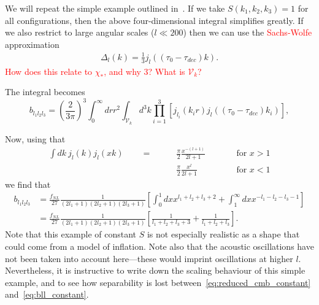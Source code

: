     We will repeat the simple example outlined in~\cite{FergShell_2}. If we
    take $S(k_1,k_2,k_3)=1$ for all configurations, then the above four-dimensional integral
    simplifies greatly. If we also restrict to large angular scales ($l\ll200$)
    then we can use the \textcolor{red}{Sachs-Wolfe} approximation
    \begin{align}
        \Delta_l(k) = \frac{1}{3}j_l((\tau_0-\tau_{dec})k).
    \end{align}
    \textcolor{red}{How does this relate to $\chi_*$, and why $3$? What is $\mathcal{V}_k$?}

    The integral becomes
    \begin{equation}
    \label{eq:reduced_cmb_constant}
    b_{l_1l_2l_3} = \left(\frac{2}{3\pi}\right)^3\int_{0}^{\infty}drr^2
        \int_{\mathcal{V}_k}d^3k \prod_{i=1}^{3}\left[j_{l_i}(k_ir)j_l((\tau_0-\tau_{dec})k_i)\right],
    \end{equation}


    Now, using that
    \begin{align}
        \int dk~j_l(k)j_l(xk)\qquad=\qquad&\frac{\pi}{2}\frac{x^{-(l+1)}}{2l+1}\qquad&&\text{for $x>1$}\\
                            \qquad&\frac{\pi}{2}\frac{x^{l}}{2l+1}\qquad&&\text{for $x<1$}
    \end{align}
    we find that
    \begin{align}
    \label{eq:bll_constant}
        b_{l_1l_2l_3} &= \frac{f_{NL}}{27}\frac{1}{(2l_1+1)(2l_2+1)(2l_3+1)}
        \left[\int^1_0dx x^{l_1+l_2+l_3+2}+\int^\infty_1dx x^{-l_1-l_2-l_3-1}\right]\\
                &= \frac{f_{NL}}{27}\frac{1}{(2l_1+1)(2l_2+1)(2l_3+1)}
        \left[\frac{1}{l_1+l_2+l_3+3}+\frac{1}{l_1+l_2+l_3}\right].
    \end{align}
    Note that this example of constant $S$ is not especially realistic as a shape that could
    come from a model of inflation. Note also that the acoustic oscillations have not been taken
    into account here---these would imprint oscillations at higher $l$.
    Nevertheless, it is instructive to write down the scaling behaviour of this
    simple example, and to see how separability is lost between~\eqref{eq:reduced_cmb_constant}
    and~\eqref{eq:bll_constant}.


